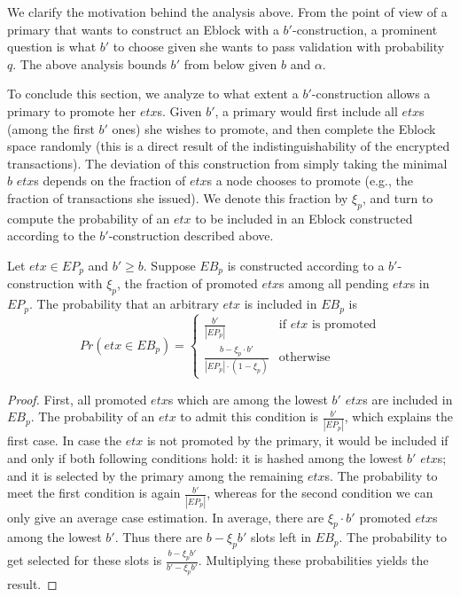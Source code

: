 We clarify the motivation behind the analysis above. From the point of view of a primary that wants to construct an Eblock with a $b'$-construction, a prominent question is what $b'$ to choose given she wants to pass validation with probability $q$. The above analysis bounds $b'$ from below given $b$ and $\alpha$.

To conclude this section, we analyze to what extent a $b'$-construction allows a primary to promote her $etx$s. Given $b'$, a primary would first include all $etx$s (among the first $b'$ ones) she wishes to promote, and then complete the Eblock space randomly (this is a direct result of the indistinguishability of the encrypted transactions). The deviation of this construction from simply taking the minimal $b$ $etx$s depends on the fraction of $etx$s a node chooses to promote (e.g., the fraction of transactions she issued). We denote this fraction by $\xi_p$, and turn to compute the probability of an $etx$ to be included in an Eblock constructed according to the $b'$-construction described above.

\begin{lemma} \label{Fairness_WRT_Pormoted_Lemma}
Let $etx\in EP_p$ and $b' \ge b$. Suppose $EB_p$ is constructed according to a $b'$-construction with $\xi_p$, the fraction of promoted $etx$s among all pending $etx$s in $EP_p$. The probability that an arbitrary $etx$ is included in $EB_p$ is   
    \begin{equation*}
    		Pr(etx\in EB_p) =	
		    \begin{cases}
    			  \frac{b'}{|EP_p|}  &\mbox{if }  etx \text{ is promoted} \\
     			  \frac{b-\xi_p \cdot b'}{|EP_p|\cdot(1-\xi_p)}  &\mbox{otherwise}
		     \end{cases}
  	\end{equation*} 
\end{lemma}
\begin{proof}
First, all promoted $etx$s which are among the lowest $b'$ $etx$s are included in $EB_p$. The probability of an $etx$ to admit this condition is $\frac{b'}{|EP_p|}$, which explains the first case. In case the $etx$ is not promoted by the primary, it would be included if and only if both following conditions hold: it is hashed among the lowest $b'$ $etx$s; and it is selected by the primary among the remaining $etx$s. The probability to meet the first condition is again $\frac{b'}{|EP_p|}$, whereas for the second condition we can only give an average case estimation. In average, there are $\xi_p\cdot b'$ promoted $etx$s among the lowest $b'$. Thus there are $b-\xi_p b'$ slots left in $EB_p$. The probability to get selected for these slots is $\frac{b-\xi_p b'}{b'-\xi_p b'}$. Multiplying these probabilities yields the result.
\end{proof}
    
